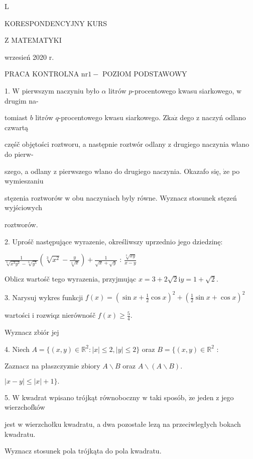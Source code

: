 \documentclass[a4paper,12pt]{article}
\begin{document}
L

KORESPONDENCYJNY KURS

Z MATEMATYKI

wrzesień 2020 r.

PRACA KONTROLNA $\mathrm{n}\mathrm{r} 1 -$ POZIOM PODSTAWOWY

1. $\mathrm{W}$ pierwszym naczyniu było $\alpha$ litrów $p$-procentowego kwasu siarkowego, $\mathrm{w}$ drugim na-

tomiast $b$ litrów $q$-procentowego kwasu siarkowego. $\mathrm{Z}\mathrm{k}\mathrm{a}\dot{\mathrm{z}}$ dego $\mathrm{z}$ naczyń odlano czwartą

częśč objętości roztworu, a następnie roztwór odlany $\mathrm{z}$ drugiego naczynia wlano do pierw-

szego, a odlany $\mathrm{z}$ pierwszego wlano do drugiego naczynia. Okazafo się, $\dot{\mathrm{z}}\mathrm{e}$ po wymieszaniu

stęzenia roztworów $\mathrm{w}$ obu naczyniach byly równe. Wyznacz stosunek stęzeń wyjściowych

roztworów.

2. Uprośč następujące wyrazenie, określiwszy uprzednio jego dziedzinę:

$\displaystyle \frac{1}{\sqrt[6]{x^{3}y^{2}}-\sqrt[6]{y^{5}}}(\sqrt[3]{x^{2}}-\frac{y}{\sqrt[3]{x}})+\frac{1}{\sqrt{x}+\sqrt{y}}$ : $\displaystyle \frac{\sqrt[3]{xy}}{x-y}$

Oblicz wartośč tego wyrazenia, przyjmując $x=3+2\sqrt{2} \mathrm{i} y=1+\sqrt{2}.$

3. Narysuj wykres funkcji $f(x)=(\displaystyle \sin x+\frac{1}{2}\cos x)^{2}+(\frac{1}{2}\sin x+\cos x)^{2}$

wartości $\mathrm{i}$ rozwiqz nierównośč $f(x)\displaystyle \geq\frac{5}{4}.$

Wyznacz zbiór jej

4. Niech $A=\{(x,y)\in \mathbb{R}^{2}:|x|\leq 2,|y|\leq 2\}$ oraz $B=\{(x,y)\in \mathbb{R}^{2}$ :

Zaznacz na płaszczyz$\acute{}$nie zbiory $A\backslash B$ oraz $A\backslash (A\backslash B).$

$|x-y|\leq|x|+1\}.$

5. $\mathrm{W}$ kwadrat wpisano trójkąt równoboczny $\mathrm{w}$ taki sposób, $\dot{\mathrm{z}}\mathrm{e}$ jeden $\mathrm{z}$ jego wierzchofków

jest $\mathrm{w}$ wierzchołku kwadratu, a dwa pozostałe lezą na przeciwległych bokach kwadratu.

Wyznacz stosunek pola trójkąta do pola kwadratu.
\end{document}
